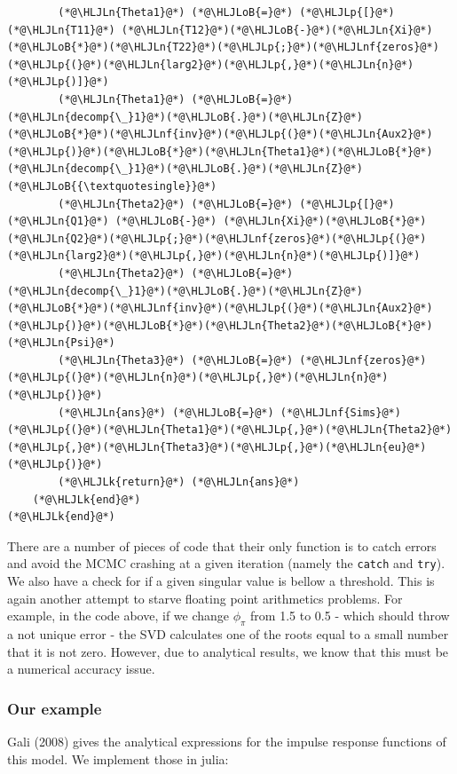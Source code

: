 \documentclass[12pt,a4paper]{article}
\newcommand{\HLJLk}[1]{\textcolor[RGB]{148,91,176}{\textbf{#1}}}
\newcommand{\HLJLn}[1]{#1}
\newcommand{\HLJLnf}[1]{\textcolor[RGB]{66,102,213}{#1}}
\newcommand{\HLJLoB}[1]{\textcolor[RGB]{102,102,102}{\textbf{#1}}}
\newcommand{\HLJLp}[1]{#1}
\begin{document}
\begin{lstlisting}
        (*@\HLJLn{Theta1}@*) (*@\HLJLoB{=}@*) (*@\HLJLp{[}@*)(*@\HLJLn{T11}@*) (*@\HLJLn{T12}@*)(*@\HLJLoB{-}@*)(*@\HLJLn{Xi}@*)(*@\HLJLoB{*}@*)(*@\HLJLn{T22}@*)(*@\HLJLp{;}@*)(*@\HLJLnf{zeros}@*)(*@\HLJLp{(}@*)(*@\HLJLn{larg2}@*)(*@\HLJLp{,}@*)(*@\HLJLn{n}@*)(*@\HLJLp{)]}@*)
        (*@\HLJLn{Theta1}@*) (*@\HLJLoB{=}@*) (*@\HLJLn{decomp{\_}1}@*)(*@\HLJLoB{.}@*)(*@\HLJLn{Z}@*)(*@\HLJLoB{*}@*)(*@\HLJLnf{inv}@*)(*@\HLJLp{(}@*)(*@\HLJLn{Aux2}@*)(*@\HLJLp{)}@*)(*@\HLJLoB{*}@*)(*@\HLJLn{Theta1}@*)(*@\HLJLoB{*}@*)(*@\HLJLn{decomp{\_}1}@*)(*@\HLJLoB{.}@*)(*@\HLJLn{Z}@*)(*@\HLJLoB{{\textquotesingle}}@*)
        (*@\HLJLn{Theta2}@*) (*@\HLJLoB{=}@*) (*@\HLJLp{[}@*)(*@\HLJLn{Q1}@*) (*@\HLJLoB{-}@*) (*@\HLJLn{Xi}@*)(*@\HLJLoB{*}@*)(*@\HLJLn{Q2}@*)(*@\HLJLp{;}@*)(*@\HLJLnf{zeros}@*)(*@\HLJLp{(}@*)(*@\HLJLn{larg2}@*)(*@\HLJLp{,}@*)(*@\HLJLn{n}@*)(*@\HLJLp{)]}@*)
        (*@\HLJLn{Theta2}@*) (*@\HLJLoB{=}@*) (*@\HLJLn{decomp{\_}1}@*)(*@\HLJLoB{.}@*)(*@\HLJLn{Z}@*)(*@\HLJLoB{*}@*)(*@\HLJLnf{inv}@*)(*@\HLJLp{(}@*)(*@\HLJLn{Aux2}@*)(*@\HLJLp{)}@*)(*@\HLJLoB{*}@*)(*@\HLJLn{Theta2}@*)(*@\HLJLoB{*}@*)(*@\HLJLn{Psi}@*)
        (*@\HLJLn{Theta3}@*) (*@\HLJLoB{=}@*) (*@\HLJLnf{zeros}@*)(*@\HLJLp{(}@*)(*@\HLJLn{n}@*)(*@\HLJLp{,}@*)(*@\HLJLn{n}@*)(*@\HLJLp{)}@*)
        (*@\HLJLn{ans}@*) (*@\HLJLoB{=}@*) (*@\HLJLnf{Sims}@*)(*@\HLJLp{(}@*)(*@\HLJLn{Theta1}@*)(*@\HLJLp{,}@*)(*@\HLJLn{Theta2}@*)(*@\HLJLp{,}@*)(*@\HLJLn{Theta3}@*)(*@\HLJLp{,}@*)(*@\HLJLn{eu}@*)(*@\HLJLp{)}@*)
        (*@\HLJLk{return}@*) (*@\HLJLn{ans}@*)
    (*@\HLJLk{end}@*)
(*@\HLJLk{end}@*)
\end{lstlisting}


There are a number of pieces of code that their only function is to catch errors and avoid the MCMC crashing at a given iteration (namely the \texttt{catch} and \texttt{try}). We also have a check for if a given singular value is bellow a threshold. This is again another attempt to starve floating point arithmetics problems. For example, in the code above, if we change $\phi_{\pi}$ from 1.5 to 0.5 - which should throw a not unique error - the SVD calculates one of the roots equal to a small number that it is not zero. However, due to analytical results, we know that this must be a numerical accuracy issue.

\subsubsection{Our example}
Gali (2008) gives the analytical expressions for the impulse response functions of this model. We implement those in julia:
\end{document}

